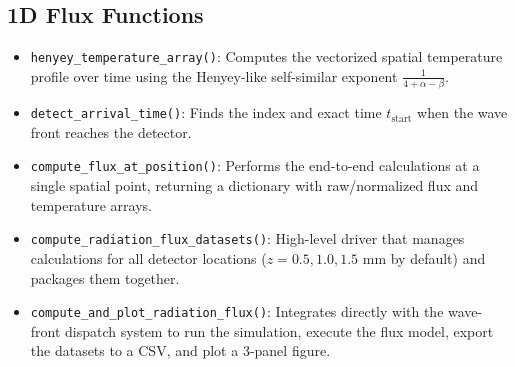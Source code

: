 \documentclass{article}
\begin{document}
\subsection{1D Flux Functions}
\begin{itemize}
    \item \texttt{henyey\_temperature\_array()}: Computes the vectorized spatial temperature profile over time using the Henyey-like self-similar exponent $\frac{1}{4+\alpha-\beta}$.
    \item \texttt{detect\_arrival\_time()}: Finds the index and exact time $t_{\text{start}}$ when the wave front reaches the detector.
    \item \texttt{compute\_flux\_at\_position()}: Performs the end-to-end calculations at a single spatial point, returning a dictionary with raw/normalized flux and temperature arrays.
    \item \texttt{compute\_radiation\_flux\_datasets()}: High-level driver that manages calculations for all detector locations ($z = 0.5, 1.0, 1.5\text{ mm}$ by default) and packages them together.
    \item \texttt{compute\_and\_plot\_radiation\_flux()}: Integrates directly with the wave-front dispatch system to run the simulation, execute the flux model, export the datasets to a CSV, and plot a 3-panel figure.
\end{itemize}
\end{document}
